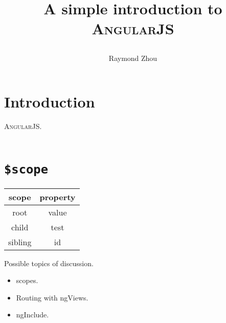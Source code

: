 \documentclass[12pt]{article}
\title{A simple introduction to \textsc{AngularJS}\date{}}
\author{Raymond Zhou}
\begin{document}
\fancyhf{}
\fancyfoot[C]{\thepage}
\renewcommand{\footrulewidth}{0.4pt}  %

\maketitle{}

\section{Introduction}

\textsc{AngularJS}.
\\\\
\section{\texttt{\$scope}}

\begin{center}
  \begin{tabular}{cc}
    \toprule
      \textbf{scope} & \textbf{property}\tabularnewline
    \midrule
      root           & value \tabularnewline
      child          & test  \tabularnewline
      sibling        & id    \tabularnewline
    \bottomrule
  \end{tabular}
\end{center}

\begin{center}
  \begin{tikzpicture}

  \end{tikzpicture}
\end{center}

Possible topics of discussion.

\begin{itemize}
  \item scopes.
  \item Routing with ngViews.
  \item ngInclude.

\end{itemize}
\end{document}
